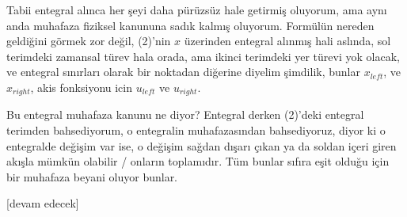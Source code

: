 \documentclass[12pt,fleqn]{article}\usepackage{../../common}
\begin{document}
Tabii entegral alınca her şeyi daha pürüzsüz hale getirmiş oluyorum, ama aynı
anda muhafaza fiziksel kanununa sadık kalmış oluyorum. Formülün nereden
geldiğini görmek zor değil, (2)'nin $x$ üzerinden entegral alınmış hali aslında,
sol terimdeki zamansal türev hala orada, ama ikinci terimdeki yer türevi
yok olacak, ve entegral sınırları olarak bir noktadan diğerine diyelim şimdilik,
bunlar $x_{left}$, ve $x_{right}$, akis fonksiyonu icin $u_{left}$ ve $u_{right}$.

Bu entegral muhafaza kanunu ne diyor? Entegral derken (2)'deki entegral terimden
bahsediyorum, o entegralin muhafazasından bahsediyoruz, diyor ki o entegralde
değişim var ise, o değişim sağdan dışarı çıkan ya da soldan içeri giren akışla
mümkün olabilir / onların toplamıdır. Tüm bunlar sıfıra eşit olduğu için
bir muhafaza beyani oluyor bunlar. 

















[devam edecek]
  
\end{document}

